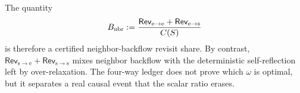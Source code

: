 The quantity
\begin{equation}
 B_{\rm nbr}:=
 \frac{\mathsf{Rev}_{\mathrm e\to\mathrm e}
       +\mathsf{Rev}_{\mathrm e\to\mathrm s}}{C(S)}
 \label{eq:backflow-share}
\end{equation}
is therefore a certified neighbor-backflow revisit share.  By contrast,
$\mathsf{Rev}_{\mathrm s\to\mathrm e}
 +\mathsf{Rev}_{\mathrm s\to\mathrm s}$ mixes neighbor
backflow with the deterministic self-reflection left by over-relaxation.  The
four-way ledger does not prove which $\omega$ is optimal, but it separates a
real causal event that the scalar ratio erases.
